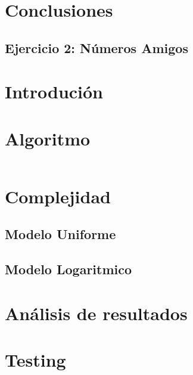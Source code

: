 \documentclass[a4paper, 12pt] {article}
\begin{document}
\section*{Conclusiones}

\newpage

\begin{center}
\section*{Ejercicio 2: N\'umeros Amigos}
\end{center}

\bigskip
\section*{Introduci\'on}

\section*{Algoritmo}

\begin{verbatim}
\end{verbatim}

\section*{Complejidad}

\subsection*{Modelo Uniforme}

\subsection*{Modelo Logaritmico}

\section*{An\'alisis de resultados}

\section*{Testing}

\begin{comment}
\begin{center}
\includegraphicx[width=0.7\textwidth]{Plots/Ej1-Complejidad.png}
\begin{center}
FiguraX
\end{center}
\end{comment}
\end{document}
